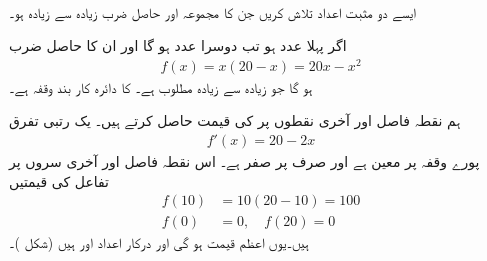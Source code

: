 
\\
ایسے دو مثبت اعداد تلاش کریں جن  کا مجموعہ  اور  حاصل ضرب زیادہ سے زیادہ ہو۔

اگر پہلا عدد  ہو تب دوسرا عدد  ہو گا اور ان کا حاصل ضرب
\begin{align*}
f(x)=x(20-x)=20x-x^2
\end{align*}
ہو گا جو زیادہ سے زیادہ مطلوب ہے۔  کا دائرہ کار بند وقفہ  ہے۔

ہم نقطہ فاصل اور آخری نقطوں پر  کی قیمت حاصل کرتے ہیں۔ یک رتبی تفرق
\begin{align*}
f'(x)=20-2x
\end{align*}
پورے وقفہ  پر معین ہے اور صرف  پر صفر ہے۔ اس نقطہ فاصل اور آخری سروں پر تفاعل کی قیمتیں
\begin{align*}
f(10)&=10(20-10)=100\\
f(0)&=0,\quad f(20)=0
\end{align*}
ہیں۔یوں  اعظم قیمت ہو گی اور درکار اعداد  اور  ہیں (شکل )۔
